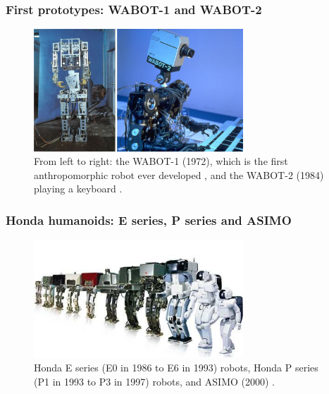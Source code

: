 \subsubsection{First prototypes: WABOT-1 and WABOT-2}
\begin{figure}
    \centering
    \includegraphics[width=0.7\textwidth]{figures/01-introduction/WABOTs.jpg}
    \caption{From left to right: the WABOT-1 (1972), which is the first anthropomorphic robot
        ever developed \cite{Kato1973TheWABOT1}, and the WABOT-2 (1984)
        playing a keyboard \cite{Kato1987WABOT2}.}
    \label{fig:introduction:WABOTs}
\end{figure}

\subsubsection{Honda humanoids: E series, P series and ASIMO}
\begin{figure}
    \centering
    \includegraphics[width=0.7\textwidth]{figures/01-introduction/The-ASIMO-humanoid-robot-history.png}
    \caption{Honda E series (E0 in 1986 to E6 in 1993) robots, Honda P series (P1 in
        1993 to P3 in 1997) robots, and ASIMO (2000)
        \cite{Shigemi2019ASIMOandHumanoidRobotResearchatHonda}.}
    \label{fig:introduction:ASIMO-humanoid-history}
\end{figure}


